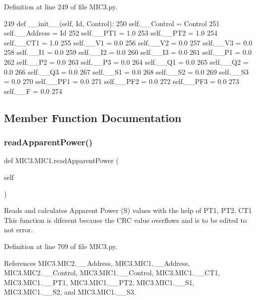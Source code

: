 Definition at line 249 of file M\+I\+C3.\+py.


\begin{DoxyCode}
249     \textcolor{keyword}{def }\_\_init\_\_(self, Id, Control):
250         self.\_\_Control = Control
251         self.\_\_Address = Id
252         self.\_\_PT1 = 1.0
253         self.\_\_PT2 = 1.0
254         self.\_\_CT1 = 1.0
255         self.\_\_V1 = 0.0
256         self.\_\_V2 = 0.0
257         self.\_\_V3 = 0.0
258         self.\_\_I1 = 0.0
259         self.\_\_I2 = 0.0
260         self.\_\_I3 = 0.0
261         self.\_\_P1 = 0.0
262         self.\_\_P2 = 0.0
263         self.\_\_P3 = 0.0
264         self.\_\_Q1 = 0.0
265         self.\_\_Q2 = 0.0
266         self.\_\_Q3 = 0.0
267         self.\_\_S1 = 0.0
268         self.\_\_S2 = 0.0
269         self.\_\_S3 = 0.0
270         self.\_\_PF1 = 0.0
271         self.\_\_PF2 = 0.0
272         self.\_\_PF3 = 0.0
273         self.\_\_F  = 0.0
274     
\end{DoxyCode}


\subsection{Member Function Documentation}
\mbox{\label{class_m_i_c3_1_1_m_i_c1_a1dfae003c1d98bdda449416f6108926e}} 
\subsubsection{\texorpdfstring{read\+Apparent\+Power()}{readApparentPower()}}
{\footnotesize\ttfamily def M\+I\+C3.\+M\+I\+C1.\+read\+Apparent\+Power (\begin{DoxyParamCaption}\item[{}]{self }\end{DoxyParamCaption})}



Reads and calculates Apparent Power (S) values with the help of P\+T1, P\+T2, C\+T1 This function is diferent because the C\+RC value overflows and is to be edited to not error. 



Definition at line 709 of file M\+I\+C3.\+py.



References M\+I\+C3.\+M\+I\+C2.\+\_\+\+\_\+\+Address, M\+I\+C3.\+M\+I\+C1.\+\_\+\+\_\+\+Address, M\+I\+C3.\+M\+I\+C2.\+\_\+\+\_\+\+Control, M\+I\+C3.\+M\+I\+C1.\+\_\+\+\_\+\+Control, M\+I\+C3.\+M\+I\+C1.\+\_\+\+\_\+\+C\+T1, M\+I\+C3.\+M\+I\+C1.\+\_\+\+\_\+\+P\+T1, M\+I\+C3.\+M\+I\+C1.\+\_\+\+\_\+\+P\+T2, M\+I\+C3.\+M\+I\+C1.\+\_\+\+\_\+\+S1, M\+I\+C3.\+M\+I\+C1.\+\_\+\+\_\+\+S2, and M\+I\+C3.\+M\+I\+C1.\+\_\+\+\_\+\+S3.


